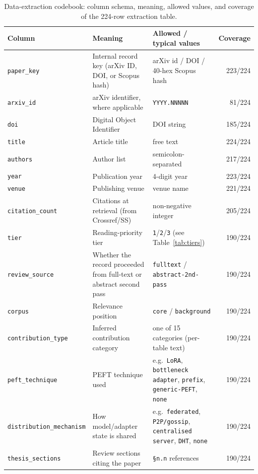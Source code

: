 \begin{table}
\centering
\caption{Data-extraction codebook: column schema, meaning, allowed values, and
coverage of the 224-row extraction table.}
\label{tab:extraction_codebook}
\small
\setlength{\tabcolsep}{4pt}
  \begin{tabular}{lp{4.5cm}p{5.4cm}r}
\toprule
\textbf{Column} & \textbf{Meaning} & \textbf{Allowed / typical values} & \textbf{Coverage} \\
\midrule
\texttt{paper\_key} & Internal record key (arXiv ID, DOI, or Scopus hash) & arXiv id / DOI / 40-hex Scopus hash & 223/224 \\
\texttt{arxiv\_id} & arXiv identifier, where applicable & \texttt{YYYY.NNNNN} & 81/224 \\
\texttt{doi} & Digital Object Identifier & DOI string & 185/224 \\
\texttt{title} & Article title & free text & 224/224 \\
\texttt{authors} & Author list & semicolon-separated & 217/224 \\
\texttt{year} & Publication year & 4-digit year & 223/224 \\
\texttt{venue} & Publishing venue & venue name & 221/224 \\
\texttt{citation\_count} & Citations at retrieval (from Crossref/SS) & non-negative integer & 205/224 \\
\texttt{tier} & Reading-priority tier & \texttt{1}/\texttt{2}/\texttt{3} (see Table~\ref{tab:tiers}) & 190/224 \\
\texttt{review\_source} & Whether the record proceeded from full-text or abstract second pass & \texttt{fulltext} / \texttt{abstract-2nd-pass} & 190/224 \\
\texttt{corpus} & Relevance position & \texttt{core} / \texttt{background} & 190/224 \\
\texttt{contribution\_type} & Inferred contribution category & one of 15 categories (per-table text) & 190/224 \\
\texttt{peft\_technique} & PEFT technique used & e.g.\ \texttt{LoRA}, \texttt{bottleneck adapter}, \texttt{prefix}, \texttt{generic-PEFT}, \texttt{none} & 190/224 \\
\texttt{distribution\_mechanism} & How model/adapter state is shared & e.g.\ \texttt{federated}, \texttt{P2P/gossip}, \texttt{centralised server}, \texttt{DHT}, \texttt{none} & 190/224 \\
\texttt{thesis\_sections} & Review sections citing the paper & \texttt{\S n.n} references & 190/224 \\

\end{tabular}
\end{table}
